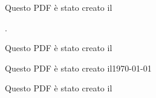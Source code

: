 \documentclass{article}
\begin{document}
	Questo PDF è stato creato il
	
	\DTMnow.
	
	Questo PDF è stato creato il
	
	\DTMNow

Questo PDF è stato creato il\today

Questo PDF è stato creato il \Today

\DTMcurrenttime

\DTMcurrentzone

\end{document}
